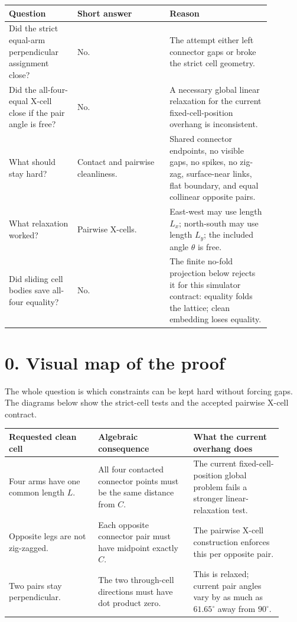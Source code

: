 \documentclass[11pt,letterpaper]{article}
\begin{document}
\begin{center}
\begin{tabular}{Y{0.23\linewidth}Y{0.31\linewidth}Y{0.34\linewidth}}
\toprule
Question & Short answer & Reason \\
\midrule
Did the strict equal-arm perpendicular assignment close? & No. & The attempt either left connector gaps or broke the strict cell geometry. \\
Did the all-four-equal X-cell close if the pair angle is free? & No. & A necessary global linear relaxation for the current fixed-cell-position overhang is inconsistent. \\
What should stay hard? & Contact and pairwise cleanliness. & Shared connector endpoints, no visible gaps, no spikes, no zig-zag, surface-near links, flat boundary, and equal collinear opposite pairs. \\
What relaxation worked? & Pairwise X-cells. & East-west may use length \(L_x\); north-south may use length \(L_y\); the included angle \(\theta\) is free. \\
Did sliding cell bodies save all-four equality? & No. & The finite no-fold projection below rejects it for this simulator contract: equality folds the lattice; clean embedding loses equality. \\
\bottomrule
\end{tabular}
\end{center}

\section*{0. Visual map of the proof}

The whole question is which constraints can be kept hard without forcing gaps. The diagrams below show the strict-cell tests and the accepted pairwise X-cell contract.

\begin{center}
\begin{tabular}{Y{0.3\linewidth}Y{0.32\linewidth}Y{0.3\linewidth}}
\toprule
Requested clean cell & Algebraic consequence & What the current overhang does \\
\midrule
Four arms have one common length \(L\). & All four contacted connector points must be the same distance from \(C\). & The current fixed-cell-position global problem fails a stronger linear-relaxation test. \\
Opposite legs are not zig-zagged. & Each opposite connector pair must have midpoint exactly \(C\). & The pairwise X-cell construction enforces this per opposite pair. \\
Two pairs stay perpendicular. & The two through-cell directions must have dot product zero. & This is relaxed; current pair angles vary by as much as \(61.65^\circ\) away from \(90^\circ\). \\
\bottomrule
\end{tabular}
\end{center}
\end{document}
